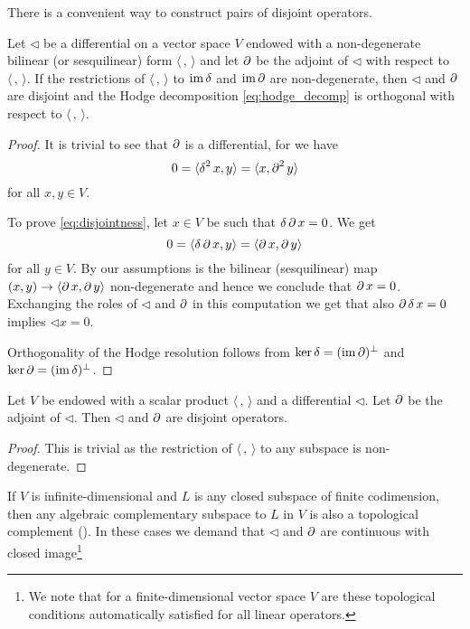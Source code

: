 There is a convenient way to construct pairs of disjoint operators.
\begin{proposition} %
 Let $\lhd$ be a differential on a vector space $V$ endowed with a non-degenerate bilinear (or sesquilinear) form $\langle \, , \, \rangle$ and let $\operatorname{\partial}$ be the adjoint of $\lhd$ with respect to $\langle \, , \, \rangle$. If the restrictions of $\langle \, , \, \rangle$ to $\operatorname{\mathrm{im}} \operatorname{\delta}$ and $\operatorname{\mathrm{im}} \operatorname{\partial}$ are non-degenerate, then $\lhd$ and $\operatorname{\partial}$ are disjoint and the Hodge decomposition \eqref{eq:hodge_decomp} is orthogonal with respect to $\langle \, , \, \rangle$.
\end{proposition}
\begin{proof}
 It is trivial to see that $\operatorname{\partial}$ is a differential, for we have 
 \[ 0 = \langle \operatorname{\delta} ^2 x, y \rangle = \langle x, \operatorname{\partial}^2 y \rangle\]
 for all $x,y\in V$.

 To prove \eqref{eq:disjointness}, let $x\in V$ be such that $\operatorname{\delta} \operatorname{\partial} x = 0$. We get
 \[ 0 = \langle \operatorname{\delta}\operatorname{\partial} x , y \rangle = \langle \operatorname{\partial} x, \operatorname{\partial} y \rangle \]
 for all $y\in V$. By our assumptions is the bilinear (sesquilinear) map $(x,y) \to \langle \operatorname{\partial} x, \operatorname{\partial} y \rangle$ non-degenerate and hence we conclude that $\operatorname{\partial} x = 0$. Exchanging the roles of $\lhd$ and $\operatorname{\partial}$ in this computation we get that also $\operatorname{\partial} \operatorname{\delta} x =0$ implies $\lhd x=0$.

 Orthogonality of the Hodge resolution follows from $\ker \operatorname{\delta} = (\operatorname{\mathrm{im}}\operatorname{\partial})^\perp$ and $\ker \operatorname{\partial} = (\operatorname{\mathrm{im}} \operatorname{\delta})^\perp$.
\end{proof}
\begin{corollary}
 Let $V$ be endowed with a scalar product $\langle \, , \, \rangle$ and a differential $\lhd$. Let $\operatorname{\partial}$ be the adjoint of $\lhd$. Then $\lhd$ and $\operatorname{\partial}$ are disjoint operators. 
\end{corollary}
\begin{proof}
 This is trivial as the restriction of $\langle \, , \, \rangle$ to any subspace is non-degenerate.
\end{proof}

 If $V$ is infinite-dimensional and $L$ is any closed subspace of finite codimension, then any algebraic complementary subspace to $L$ in $V$ is also a topological complement (\cite{schaefer_topological_1999}). In these cases we demand that $\lhd$ and $\operatorname{\partial}$ are continuous with closed image\footnote{We note that for a finite-dimensional vector space $V$ are these topological conditions automatically satisfied for all linear operators.}

